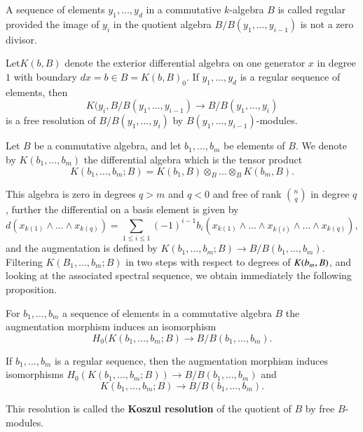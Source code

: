 \begin{definition}\label{chap6-defi3.1}
A sequence of elements $y_{1},\ldots,y_{d}$ in a commutative
$k$-algebra $B$ is called regular provided the image of $y_{i}$ in the
quotient algebra $B/B(y_{1},\ldots,y_{i-1})$ is not a zero divisor.
\end{definition}

Let\pageoriginale $K(b,B)$ denote the exterior differential algebra on
one generator $x$ in degree $1$ with boundary $dx=b\in
B=K(b,B)_{0}$. If $y_{1},\ldots,y_{d}$ is a regular sequence of
elements, then
$$
K(y_{i},B/B(y_{1},\ldots,y_{i-1})\to B/B(y_{1},\ldots,y_{i})
$$
is a free resolution of $B/B(y_{1},\ldots,y_{i})$ by
$B(y_{1},\ldots,y_{i-1})$-modules. 

\begin{notation}\label{chap6-not3.2}
Let $B$ be a commutative algebra, and let $b_{1},\ldots,b_{m}$ be
elements of $B$. We denote by $K(b_{1},\ldots,b_{m})$ the differential
algebra which is the tensor product
$$
K(b_{1},\ldots,b_{m};B)=K(b_{1},B)\otimes_{B}\ldots
\otimes_{B}K(b_{m},B).
$$

This algebra is zero in degrees $q>m$ and $q<0$ and free of rank
$\binom{n}{q}$ in degree $q$, further the differential on a basis
element is given by
$$
d(x_{k(1)}\wedge\ldots\wedge x_{k(q)})=\sum_{1\leq i\leq
  1}(-1)^{i-1}b_{i}(x_{k(1)}\wedge\ldots\wedge
x_{k(i)}\wedge\ldots\wedge x_{k(q)}),
$$
and the augmentation is defined by $K(b_{1},\ldots,b_{m};B)\to
B/B(b_{1},\ldots,b_{m})$. Filtering $K(B_{1},\ldots,b_{m};B)$ in two
steps with respect to degrees of $K(b_{m},\break B)$, and looking at the
associated spectral sequence, we obtain immediately the following
proposition. 
\end{notation}

\begin{proposition}\label{chap6-prop3.3}
For $b_{1},\ldots,b_{m}$ a sequence of elements in a commutative
algebra $B$ the augmentation morphism induces an isomorphism
$$
H_{0}(K(b_{1},\ldots,b_{m};B)\to B/B(b_{1},\ldots,b_{m}).
$$

If $b_{1},\ldots,b_{m}$ is a regular sequence, then the augmentation
morphism induces isomorphisms $H_{0}(K(b_{1},\ldots,b_{m};B))\to
B/B(b_{1},\ldots,b_{m})$ and 
$$
K(b_{1},\ldots,b_{m};B)\to B/B(b_{1},\ldots,b_{m}).
$$
\end{proposition}

This resolution is called the {\bf Koszul resolution} of the quotient of $B$ by free $B$-modules. 

